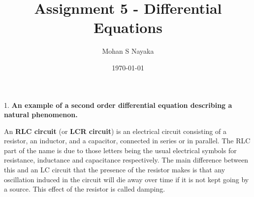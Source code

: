 \documentclass{article}
\begin{document}
\title{Assignment 5 - Differential Equations }
\date{\today}
\author{Mohan S Nayaka}
\renewcommand{\arraystretch}{1.5}
\maketitle

1. \textbf{An example of a second order differential equation describing a natural phenomenon.}

An \textbf{RLC circuit} (or \textbf{LCR circuit}) is an electrical circuit consisting of a resistor, an inductor, and a capacitor, connected in series or in parallel. The RLC part of the name is due to those letters being the usual electrical symbols for resistance, inductance and capacitance respectively. The main difference between this and an LC circuit that the presence of the resistor makes is that any oscillation induced in the circuit will die away over time if it is not kept going by a source. This effect of the resistor is called damping.
\end{document}
